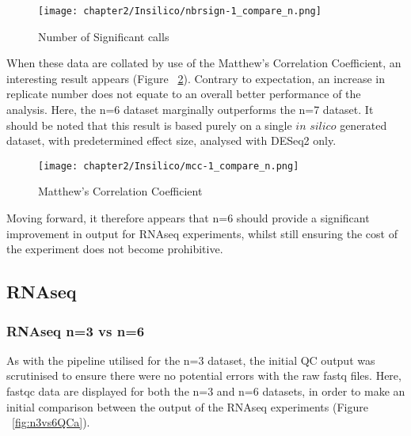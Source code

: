 \begin{figure}[!htbp]
  \centering 
  \texttt{[image: chapter2/Insilico/nbrsign-1\_compare\_n.png]} 
  \caption[DESeq2 Comparison of Replicates - Number of Significant calls]{Number of Significant calls}
  \label{fig:numbersig_n}
\end{figure} 

When these data are collated by use of the Matthew's Correlation Coefficient, an interesting result appears (Figure ~\ref{fig:mcc_n}). Contrary to expectation, an increase in replicate number does not equate to an overall better performance of the analysis. Here, the n=6 dataset marginally outperforms the n=7 dataset. It should be noted that this result is based purely on a single $\textit{in silico}$ generated dataset, with predetermined effect size, analysed with DESeq2 only. \\

\begin{figure}[!htbp]
  \centering 
  \texttt{[image: chapter2/Insilico/mcc-1\_compare\_n.png]} 
  \caption[DESeq2 Comparison of Replicates - Matthew's Correlation Coefficient]{Matthew's Correlation Coefficient}
  \label{fig:mcc_n}
\end{figure}

Moving forward, it therefore appears that n=6 should provide a significant improvement in output for RNAseq experiments, whilst still ensuring the cost of the experiment does not become prohibitive.\\















\subsection{RNAseq}

\subsubsection{RNAseq n=3 vs n=6}

As with the pipeline utilised for the n=3 dataset, the initial QC output was scrutinised to ensure there were no potential errors with the raw fastq files. Here, fastqc data are displayed for both the n=3 and n=6 datasets, in order to make an initial comparison between the output of the RNAseq experiments (Figure ~\ref{fig:n3vs6QCa}). 

